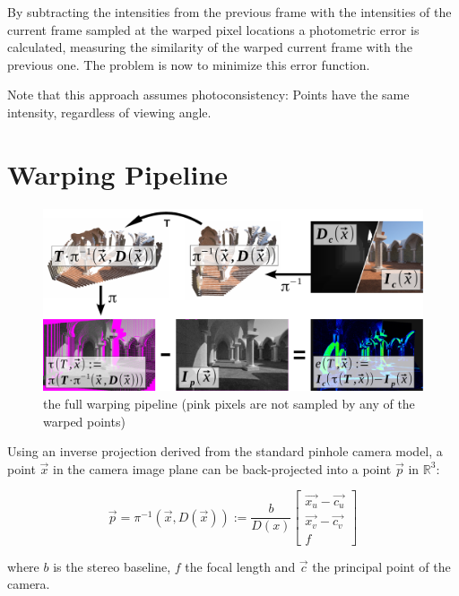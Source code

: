 By subtracting the intensities from the previous frame with the
intensities of the current frame sampled at the warped pixel locations a
photometric error is calculated, measuring the similarity of the warped current
frame with the previous one. The problem is now to minimize this error function.

Note that this approach assumes photoconsistency: Points have the same
intensity, regardless of viewing angle.


\section{Warping Pipeline}

\begin{figure}[h]
    \centering
    \includegraphics[width=\textwidth]{images/warp_pipeline.pdf}
    \caption{the full warping pipeline (pink pixels are not sampled by any of the warped points)}
    \label{fig:warp_pipeline}
\end{figure}


Using an inverse projection derived from the standard pinhole camera model, a
point $ \vec{x} $ in the camera image plane can be back-projected into a point
$ \vec{p} $ in $ \mathbb{R}^3 $:

\begin{equation}
    \label{eq:backprojection}
    \vec{p} = \pi^{-1}(\vec{x}, D(\vec{x})) := \frac{b}{D(x)}
    \begin{bmatrix}
        \vec{x_u} - \vec{c_u} \\
        \vec{x_v} - \vec{c_v} \\
        f
    \end{bmatrix}
\end{equation}

where $b$ is the stereo baseline, $f$ the focal length and $\vec{c}$ the principal point of the camera.

